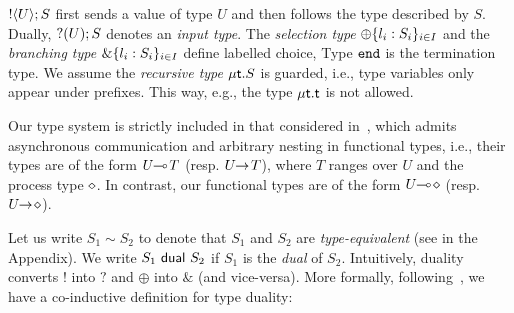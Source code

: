 $! \langle U \rangle ; S$ %
first sends a value of
type $U$ and then follows the type described by $S$.  Dually,
$? (U) ; S$ denotes an {\em input type}. 
The {\em selection type}
$\oplus \{l_i:S_i\}_{i \in I}$ 
and the 
{\em branching type}
$\& \{l_i:S_i\}_{i \in I}$ 
define labelled choice, 
Type $\mathtt{end}$ is the termination type. 
We assume the {\em recursive type} $\mu\mathsf{t}.S$ is guarded,
i.e., type variables only appear under prefixes. 
This way, 
e.g.,  the type $\mu\mathsf{t}.\mathsf{t}$ is not allowed. 




Our type system is strictly included in that considered in~\cite{tlca07,MostrousY15}, which admits asynchronous communication and arbitrary nesting in functional types, i.e., their types are of the form 
$U\!\! \multimap\!T$ 
(resp. $U\!\! \rightarrow\!T$),
where $T$ ranges over $U$ and the process type $\diamond$. 
In contrast, our functional types are of the form $U\!\! \multimap\! \diamond$ (resp. $U\!\! \rightarrow\! \diamond$). 

Let us write $S_1 \sim S_2$
to denote that $S_1$ and $S_2$ are \emph{type-equivalent} (see 
 in the Appendix).
We write $S_1 \ \mathsf{dual}\  S_2$ if 
$S_1$ is the \emph{dual} of $S_2$.   
Intuitively, 
duality
converts $!$ into $?$ and $\oplus$ into $\&$ (and vice-versa).
More formally, following~\cite{TGC14},
we have a co-inductive definition for 
type {duality}:

